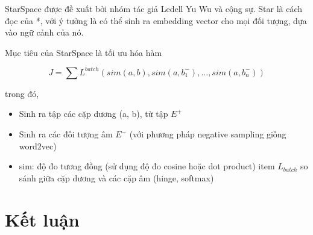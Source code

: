 \documentclass[11pt,a4paper]{article}
\begin{document}
StarSpace được đề xuất bởi nhóm tác giả Ledell Yu Wu và cộng sự. Star là cách đọc của *, với ý tưởng là có thể sinh ra embedding vector cho mọi đối tượng, dựa vào ngữ cảnh của nó.

Mục tiêu của StarSpace là tối ưu hóa hàm

$$J = \sum L^{batch} \left( sim(a, b), sim(a, b_1^{-}),..., sim(a, b_n^{-}) \right)$$

trong đó,

\begin{itemize}
  \item Sinh ra tập các cặp dương (a, b), từ tập $E^{+}$
  \item Sinh ra các đối tượng âm $E^{-}$ (với phương pháp negative sampling giống word2vec)
  \item sim: độ đo tương đồng (sử dụng độ đo cosine hoặc dot product)
  item $L_{batch}$ so sánh giữa cặp dương và các cặp âm (hinge, softmax)
\end{itemize}

\section{Kết luận}




\end{document}

